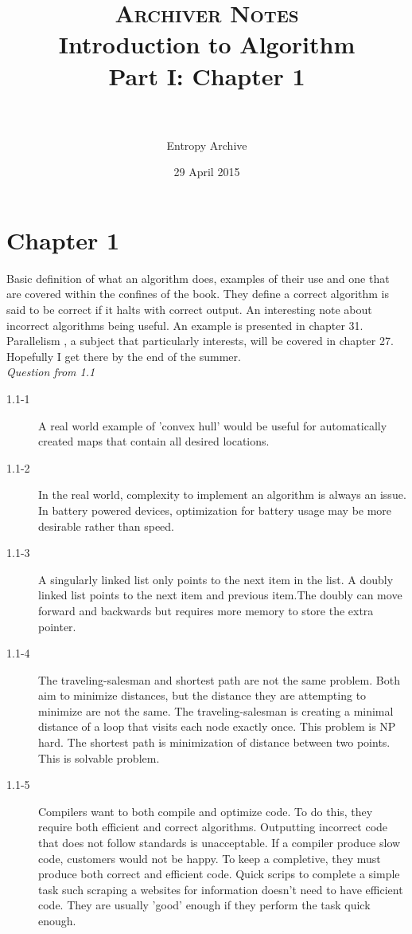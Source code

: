 \documentclass{article}
\title{
    \normalfont \normalsize
    \textsc{Archiver Notes} 
    \horrule{0.5pt} \\
    \huge Introduction to Algorithm \\
    \small Part I: Chapter 1\\
    \horrule{2pt} \\
}
\author{Entropy Archive}
\date{\normalsize 29 April 2015}
\begin{document}
\maketitle
\section*{Chapter 1}
Basic definition of what an algorithm does, examples of their use and one that
are covered within the confines of the book. They define a correct algorithm is
said to be correct if it halts with correct output. An interesting note about
incorrect algorithms being useful. An example is presented in chapter 31.
Parallelism , a subject that particularly interests, will be covered in chapter
27. Hopefully I get there by the end of the summer.\\ 

\textit{Question from 1.1}
\begin{description}
\item[1.1-1] 
A real world example of 'convex hull' would be useful for automatically created
maps that contain all desired locations. 
\item[1.1-2]
In the real world, complexity to implement an algorithm is always an issue. In
battery powered devices, optimization for battery usage may be more desirable
rather than speed.   
\item[1.1-3] A singularly linked list only points to the next item in the list.
A doubly linked list points to the next item and previous item.The doubly can
move forward and backwards but requires more memory to store the extra pointer.
\item[1.1-4] The traveling-salesman and shortest path are not the same problem.
Both aim to minimize distances, but the distance they are attempting to
minimize are not the same. The traveling-salesman is creating a minimal
distance of a loop that visits each node exactly once. This problem is NP hard.
The shortest path is minimization of distance between two points. This is
solvable problem. 
\item[1.1-5] Compilers want to both compile and optimize code. To do this, they
require both efficient and correct algorithms. Outputting incorrect code that
does not follow standards is unacceptable. If a compiler produce slow code,
customers would not be happy. To keep a completive, they must produce both
correct and efficient code. Quick scrips to complete a simple task such
scraping a websites for information doesn't need to have efficient code. They
are usually 'good' enough if they perform the task quick enough.    
\end{description}


   
\end{document}
